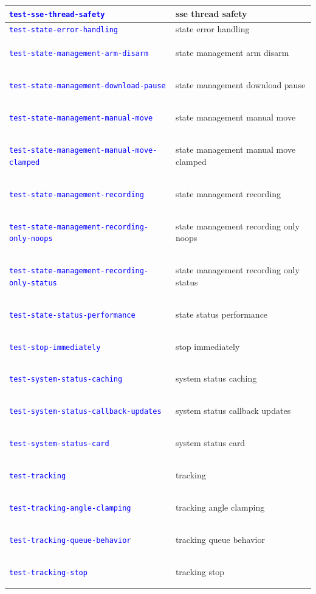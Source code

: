 \documentclass[12pt, titlepage]{article}
\newcommand{\tiddef}[1]{\hypertarget{tid:#1}{\textcolor{blue}{\texttt{#1}}}}
\begin{document}
\begin{longtable}{|>{\raggedright\arraybackslash}p{5cm}|>{\raggedright\arraybackslash}p{9cm}|}
  \tiddef{test-sse-thread-safety}                      & sse thread safety                      \\ \hline
  \tiddef{test-state-error-handling}                   & state error handling                   \\ \hline
  \tiddef{test-state-management-arm-disarm}            & state management arm disarm            \\ \hline
  \tiddef{test-state-management-download-pause}        & state management download pause        \\ \hline
  \tiddef{test-state-management-manual-move}           & state management manual move           \\ \hline
  \tiddef{test-state-management-manual-move-clamped}   & state management manual move clamped   \\ \hline
  \tiddef{test-state-management-recording}             & state management recording             \\ \hline
  \tiddef{test-state-management-recording-only-noops}  & state management recording only noops  \\ \hline
  \tiddef{test-state-management-recording-only-status} & state management recording only status \\ \hline
  \tiddef{test-state-status-performance}               & state status performance               \\ \hline
  \tiddef{test-stop-immediately}                       & stop immediately                       \\ \hline
  \tiddef{test-system-status-caching}                  & system status caching                  \\ \hline
  \tiddef{test-system-status-callback-updates}         & system status callback updates         \\ \hline
  \tiddef{test-system-status-card}                     & system status card                     \\ \hline
  \tiddef{test-tracking}                               & tracking                               \\ \hline
  \tiddef{test-tracking-angle-clamping}                & tracking angle clamping                \\ \hline
  \tiddef{test-tracking-queue-behavior}                & tracking queue behavior                \\ \hline
  \tiddef{test-tracking-stop}                          & tracking stop                          \\ \hline

\end{longtable}
\end{document}
